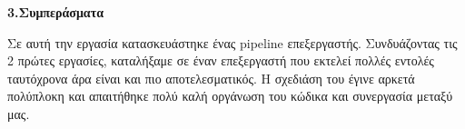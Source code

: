 { \large \bfseries 3.Συμπεράσματα}\\ %

\begin{justify}
    Σε αυτή την εργασία κατασκευάστηκε ένας \textlatin{pipeline} επεξεργαστής. Συνδυάζοντας τις 2 πρώτες εργασίες, καταλήξαμε σε έναν
    επεξεργαστή που εκτελεί πολλές εντολές ταυτόχρονα άρα
    είναι και πιο αποτελεσματικός. Η σχεδιάση του έγινε
    αρκετά πολύπλοκη και απαιτήθηκε πολύ καλή οργάνωση
    του κώδικα και συνεργασία μεταξύ μας.
\end{justify}